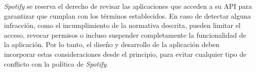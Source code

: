 \textit{Spotify} se reserva el derecho de revisar las aplicaciones que acceden a su API para garantizar que cumplan con los términos establecidos. En caso de detectar alguna infracción, como el incumplimiento de la normativa descrita, pueden limitar el acceso, revocar permisos o incluso suspender completamente la funcionalidad de la aplicación. Por lo tanto, el diseño y desarrollo de la aplicación deben incorporar estas consideraciones desde el principio, para evitar cualquier tipo de conflicto con la política de \textit{Spotify}.
